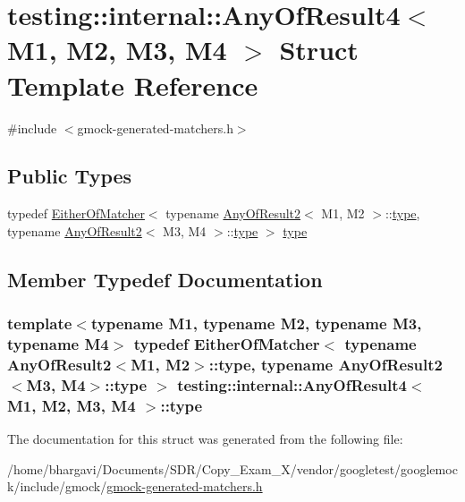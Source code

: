 \hypertarget{structtesting_1_1internal_1_1_any_of_result4}{}\section{testing\+:\+:internal\+:\+:Any\+Of\+Result4$<$ M1, M2, M3, M4 $>$ Struct Template Reference}
\label{structtesting_1_1internal_1_1_any_of_result4}


{\ttfamily \#include $<$gmock-\/generated-\/matchers.\+h$>$}

\subsection*{Public Types}
\begin{DoxyCompactItemize}
\item 
typedef \hyperlink{classtesting_1_1internal_1_1_either_of_matcher}{Either\+Of\+Matcher}$<$ typename \hyperlink{structtesting_1_1internal_1_1_any_of_result2}{Any\+Of\+Result2}$<$ M1, M2 $>$\+::\hyperlink{structtesting_1_1internal_1_1_any_of_result4_a4f3c9aebb4f7fc24287b59a0bdf1a4a6}{type}, typename \hyperlink{structtesting_1_1internal_1_1_any_of_result2}{Any\+Of\+Result2}$<$ M3, M4 $>$\+::\hyperlink{structtesting_1_1internal_1_1_any_of_result4_a4f3c9aebb4f7fc24287b59a0bdf1a4a6}{type} $>$ \hyperlink{structtesting_1_1internal_1_1_any_of_result4_a4f3c9aebb4f7fc24287b59a0bdf1a4a6}{type}
\end{DoxyCompactItemize}


\subsection{Member Typedef Documentation}
\subsubsection[{\texorpdfstring{type}{type}}]{\setlength{\rightskip}{0pt plus 5cm}template$<$typename M1, typename M2, typename M3, typename M4$>$ typedef {\bf Either\+Of\+Matcher}$<$ typename {\bf Any\+Of\+Result2}$<$M1, M2$>$\+::{\bf type}, typename {\bf Any\+Of\+Result2}$<$M3, M4$>$\+::{\bf type} $>$ {\bf testing\+::internal\+::\+Any\+Of\+Result4}$<$ M1, M2, M3, M4 $>$\+::{\bf type}}\hypertarget{structtesting_1_1internal_1_1_any_of_result4_a4f3c9aebb4f7fc24287b59a0bdf1a4a6}{}\label{structtesting_1_1internal_1_1_any_of_result4_a4f3c9aebb4f7fc24287b59a0bdf1a4a6}


The documentation for this struct was generated from the following file\+:\begin{DoxyCompactItemize}
\item 
/home/bhargavi/\+Documents/\+S\+D\+R/\+Copy\+\_\+\+Exam\+\_\+X/vendor/googletest/googlemock/include/gmock/\hyperlink{gmock-generated-matchers_8h}{gmock-\/generated-\/matchers.\+h}\end{DoxyCompactItemize}
